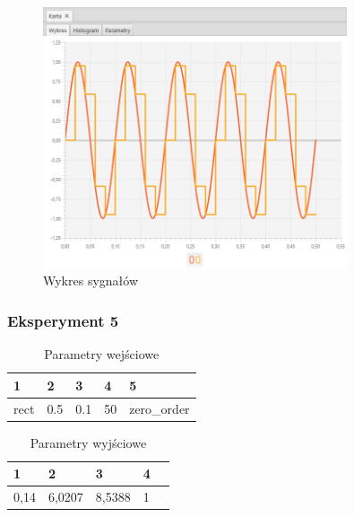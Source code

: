 \documentclass[12pt]{article}
\begin{document}
{{{                \begin{figure}[H]
                    \centering
                    \includegraphics[width=0.8\textwidth]{img/result/experiment2/04/data_draw_original_chart_recon_output_130409.png}
                    \caption{Wykres sygnałów}
                \end{figure}
            }
            \newpage

            \subsubsection{Eksperyment 5} {
                \begin{table}[H]
                    \centering
                    \begin{tabular}{|l|l|l|l|l|}
                        \hline
                        1 & 2 & 3 & 4 & 5   \\ \hline
                        rect & 0.5 & 0.1 & 50 & zero\_order  \\ \hline
                    \end{tabular}
                    \caption{Parametry wejściowe}
                \end{table}

                \begin{table}[H]
                    \centering
                    \begin{tabular}{|l|l|l|l|l|}
                        \hline
                        1 & 2 & 3 & 4   \\ \hline
                        0,14 & 6,0207 & 8,5388 & 1 \\ \hline
                    \end{tabular}
                    \caption{Parametry wyjściowe}
                \end{table}


}}}
\end{document}
